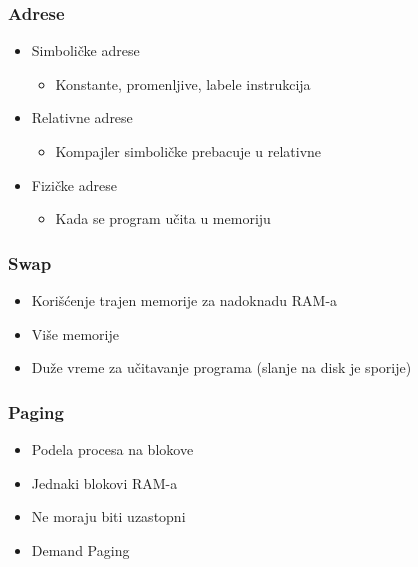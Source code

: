 \documentclass{beamer}
\begin{document}
\begin{frame}
    \frametitle{Adrese}
    \begin{itemize}
        \item Simboličke adrese \begin{itemize}
            \item Konstante, promenljive, labele instrukcija \newline
        \end{itemize}
        \item Relativne adrese \begin{itemize}
            \item Kompajler simboličke prebacuje u relativne \newline
        \end{itemize}
        \item Fizičke adrese \begin{itemize}
            \item Kada se program učita u memoriju
        \end{itemize}
    \end{itemize}
\end{frame}

\begin{frame}
    \frametitle{Swap}
    \begin{itemize}
        \item Korišćenje trajen memorije za nadoknadu RAM-a \newline
        \item Više memorije \newline
        \item Duže vreme za učitavanje programa (slanje na disk je sporije)
    \end{itemize}
\end{frame}

\begin{frame}
    \frametitle{Paging}
    \begin{itemize}
        \item Podela procesa na blokove \newline
        \item Jednaki blokovi RAM-a \newline
        \item Ne moraju biti uzastopni \newline
        \item Demand Paging
    \end{itemize}
\end{frame}
\end{document}
